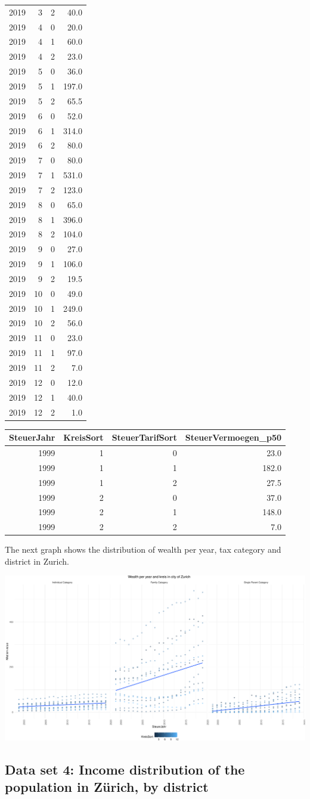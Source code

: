 \documentclass[
]{article}
\begin{document}
\begin{longtable}[]{@{}rrrr@{}}
2019 & 3 & 2 & 40.0\tabularnewline
2019 & 4 & 0 & 20.0\tabularnewline
2019 & 4 & 1 & 60.0\tabularnewline
2019 & 4 & 2 & 23.0\tabularnewline
2019 & 5 & 0 & 36.0\tabularnewline
2019 & 5 & 1 & 197.0\tabularnewline
2019 & 5 & 2 & 65.5\tabularnewline
2019 & 6 & 0 & 52.0\tabularnewline
2019 & 6 & 1 & 314.0\tabularnewline
2019 & 6 & 2 & 80.0\tabularnewline
2019 & 7 & 0 & 80.0\tabularnewline
2019 & 7 & 1 & 531.0\tabularnewline
2019 & 7 & 2 & 123.0\tabularnewline
2019 & 8 & 0 & 65.0\tabularnewline
2019 & 8 & 1 & 396.0\tabularnewline
2019 & 8 & 2 & 104.0\tabularnewline
2019 & 9 & 0 & 27.0\tabularnewline
2019 & 9 & 1 & 106.0\tabularnewline
2019 & 9 & 2 & 19.5\tabularnewline
2019 & 10 & 0 & 49.0\tabularnewline
2019 & 10 & 1 & 249.0\tabularnewline
2019 & 10 & 2 & 56.0\tabularnewline
2019 & 11 & 0 & 23.0\tabularnewline
2019 & 11 & 1 & 97.0\tabularnewline
2019 & 11 & 2 & 7.0\tabularnewline
2019 & 12 & 0 & 12.0\tabularnewline
2019 & 12 & 1 & 40.0\tabularnewline
2019 & 12 & 2 & 1.0\tabularnewline
\bottomrule
\end{longtable}

\begin{longtable}[]{@{}rrrr@{}}
\toprule
SteuerJahr & KreisSort & SteuerTarifSort &
SteuerVermoegen\_p50\tabularnewline
\midrule
\endhead
1999 & 1 & 0 & 23.0\tabularnewline
1999 & 1 & 1 & 182.0\tabularnewline
1999 & 1 & 2 & 27.5\tabularnewline
1999 & 2 & 0 & 37.0\tabularnewline
1999 & 2 & 1 & 148.0\tabularnewline
1999 & 2 & 2 & 7.0\tabularnewline
\bottomrule
\end{longtable}

The next graph shows the distribution of wealth per year, tax category
and district in Zurich.

\includegraphics{report_files/figure-latex/plot_wealth-1.pdf}

\hypertarget{data-set-4-income-distribution-of-the-population-in-zuxfcrich-by-district}{%
\subsection{Data set 4: Income distribution of the population in Zürich,
by
district}\label{data-set-4-income-distribution-of-the-population-in-zuxfcrich-by-district}}
\end{document}
